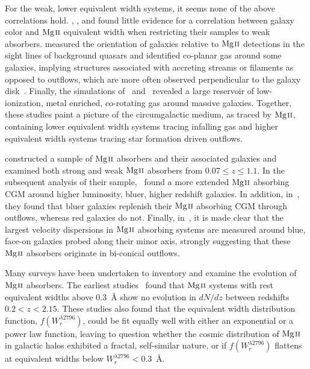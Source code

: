 \documentclass[iop,apj,numberedappendix,appendixfloats,twocolappendix]{emulateapj}
\begin{document}
For the weak, lower equivalent width systems, it seems none of the above correlations hold. \cite{Chen2010b}, \cite{Kacprzak2011}, and \cite{Lovegrove2011} found little evidence for a correlation between galaxy color and ${\hbox{{\rm Mg}\kern 0.1em{\sc ii}}}$ equivalent width when restricting their samples to weak absorbers. \cite{Kacprzak2011} measured the orientation of galaxies relative to ${\hbox{{\rm Mg}\kern 0.1em{\sc ii}}}$ detections in the sight lines of background quasars and identified co-planar gas around some galaxies, implying structures associated with accreting streams or filaments as opposed to outflows, which are more often observed perpendicular to the galaxy disk~\citep{Bordoloi2011,Kacprzak2012-PA}. Finally, the simulations of~\cite{Stewart2011} and~\cite{Ford2013mass} revealed a large reservoir of low-ionization, metal enriched, co-rotating gas around massive galaxies. Together, these studies paint a picture of the circumgalactic medium, as traced by ${\hbox{{\rm Mg}\kern 0.1em{\sc ii}}}$, containing lower equivalent width systems tracing infalling gas and higher equivalent width systems tracing star formation driven outflows.

\cite{MAGIICAT1} constructed a sample of ${\hbox{{\rm Mg}\kern 0.1em{\sc ii}}}$ absorbers and their associated galaxies and examined both strong and weak ${\hbox{{\rm Mg}\kern 0.1em{\sc ii}}}$ absorbers from $0.07 \le z \le 1.1$. In the subsequent analysis of their sample,~\cite{MAGIICAT2} found a more extended ${\hbox{{\rm Mg}\kern 0.1em{\sc ii}}}$ absorbing CGM around higher luminosity, bluer, higher redshift galaxies. In addition, in~\cite{MAGIICAT4}, they found that bluer galaxies replenish their ${\hbox{{\rm Mg}\kern 0.1em{\sc ii}}}$ absorbing CGM through outflows, whereas red galaxies do not. Finally, in~\cite{MAGIICAT5}, it is made clear that the largest velocity dispersions in ${\hbox{{\rm Mg}\kern 0.1em{\sc ii}}}$ absorbing systems are measured around blue, face-on galaxies probed along their minor axis, strongly suggesting that these ${\hbox{{\rm Mg}\kern 0.1em{\sc ii}}}$ absorbers originate in bi-conical outflows.

Many surveys have been undertaken to inventory and examine the evolution of ${\hbox{{\rm Mg}\kern 0.1em{\sc ii}}}$ absorbers. The earliest studies~\citep{Lanzetta1987,Tytler1987,Sargent1988,Steidel1992} found that ${\hbox{{\rm Mg}\kern 0.1em{\sc ii}}}$ systems with rest equivalent widths above $0.3$~{\AA} show no evolution in $dN\!/dz$ between redshifts $0.2 < z < 2.15$. These studies also found that the equivalent width distribution function, $f(W_r^{\lambda2796})$, could be fit equally well with either an exponential or a power law function, leaving to question whether the cosmic distribution of ${\hbox{{\rm Mg}\kern 0.1em{\sc ii}}}$ in galactic halos exhibited a fractal, self-similar nature, or if $f(W_r^{\lambda2796})$ flattens at equivalent widths below $W_r^{\lambda2796} < 0.3$~{\AA}.
\end{document}
